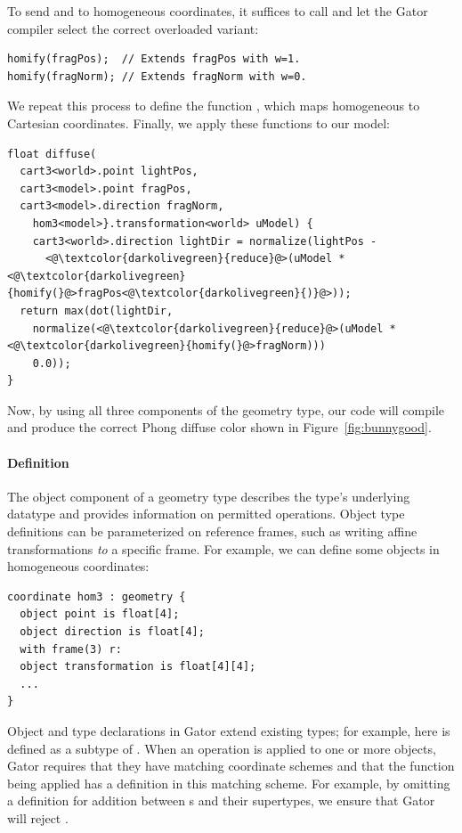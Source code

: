To send  and  to homogeneous coordinates, it suffices to call  and let the Gator compiler select the correct overloaded variant:
%
\begin{lstlisting}
homify(fragPos);  // Extends fragPos with w=1.
homify(fragNorm); // Extends fragNorm with w=0.
\end{lstlisting}  
%
We repeat this process to define the function , which maps homogeneous to Cartesian coordinates.  Finally, we apply these functions to our model:
%
\begin{lstlisting}
float diffuse(
  cart3<world>.point lightPos, 
  cart3<model>.point fragPos, 
  cart3<model>.direction fragNorm,
    hom3<model>}.transformation<world> uModel) {
    cart3<world>.direction lightDir = normalize(lightPos - 
      <@\textcolor{darkolivegreen}{reduce}@>(uModel * <@\textcolor{darkolivegreen}{homify(}@>fragPos<@\textcolor{darkolivegreen}{)}@>));
  return max(dot(lightDir,
    normalize(<@\textcolor{darkolivegreen}{reduce}@>(uModel * <@\textcolor{darkolivegreen}{homify(}@>fragNorm)))
    0.0));
}
\end{lstlisting}
%
Now, by using all three components of the geometry type, our code will compile and produce the correct Phong diffuse color shown in Figure~\ref{fig:bunnygood}.

\paragraph{Definition}
The object component of a geometry type describes the type's underlying datatype and provides information on permitted operations.  
Object type definitions can be parameterized on reference frames, such as writing affine transformations \textit{to} a specific frame.
For example, we can define some objects in homogeneous coordinates:
%
\begin{lstlisting}
coordinate hom3 : geometry {
  object point is float[4];
  object direction is float[4];
  with frame(3) r:
  object transformation is float[4][4];
  ...
}
\end{lstlisting}
%
Object and type declarations in Gator extend existing types; for example, here  is defined as a subtype of .
When an operation is applied to one or more objects, Gator requires that they have matching coordinate schemes and that the function being applied has a definition in this matching scheme.
For example, by omitting a definition for addition between s and their supertypes, we ensure that Gator will reject  .

